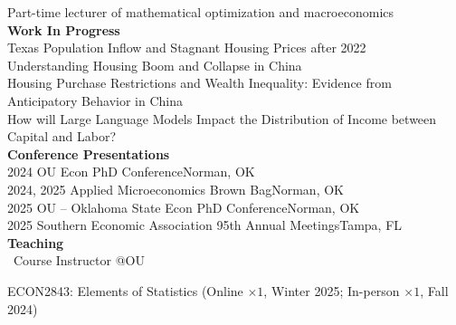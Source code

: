 \documentclass[10pt,letterpaper]{article}
\begin{document}
		Part-time lecturer of mathematical optimization and macroeconomics\medskip\\
	{\bf Work In Progress}\medskip\\
Texas Population Inflow and Stagnant Housing Prices after 2022\smallskip\\
Understanding Housing Boom and Collapse in China\smallskip\\
Housing Purchase Restrictions and Wealth Inequality: Evidence from Anticipatory Behavior in China\smallskip\\
How will Large Language Models Impact the Distribution of Income between Capital and Labor?\medskip\\
{\bf Conference Presentations}\medskip\\
2024 OU Econ PhD Conference\hfill Norman, OK\smallskip\\
2024, 2025 Applied Microeconomics Brown Bag\hfill Norman, OK\smallskip\\
2025 OU -- Oklahoma State Econ PhD Conference\hfill Norman, OK\smallskip\\
2025 Southern Economic Association 95th Annual Meetings\hfill Tampa, FL\bigskip\\
	{\bf Teaching}\medskip\\
	{\ Course Instructor @OU}
	
	ECON2843: Elements of Statistics (Online $\times 1$, Winter 2025; In-person $\times 1$, Fall 2024)
	
\end{document}
